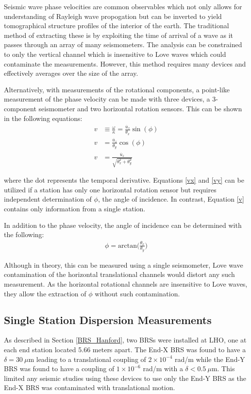 \documentclass [12pt, proquest]{uwthesis}[2019]
\begin{document}
Seismic wave phase velocities are common observables which not only allows for understanding of Rayleigh wave propogation but can be inverted to yield tomographical structure profiles of the interior of the earth. \cite{tomography} The traditional method of extracting these is by exploiting the time of arrival of a wave as it passes through an array of many seismometers. The analysis can be constrained to only the vertical channel which is insensitive to Love waves which could contaminate the measurements. However, this method requires many devices and effectively averages over the size of the array.

Alternatively, with measurements of the rotational components, a point-like measurement of the phase velocity can be made with three devices, a 3-component seismometer and two horizontal rotation sensors. This can be shown in the following equations:
\begin{align} 
v&\equiv\frac{\omega}{\kappa} = \frac{\dot{u_z}}{\theta_x}\sin(\phi) \label{vx} \\
v&=\frac{\dot{u_z}}{\theta_y}\cos(\phi)\label{vy} \\
v&=\frac{\dot{u_z}}{\sqrt{\theta_x^2+\theta_y^2}} \label{v}
\end{align}

where the dot represents the temporal derivative. Equations \ref{vx} and \ref{vy} can be utilized if a station has only one horizontal rotation sensor but requires independent determination of $\phi$, the angle of incidence. In contrast, Equation \ref{v} contains only information from a single station.

In addition to the phase velocity, the angle of incidence can be determined with the following:
\begin{align}
\phi=\text{arctan}\bigg(\frac{\theta_x}{\theta_y}\bigg)
\end{align}

Although in theory, this can be measured using a single seismometer, Love wave contamination of the horizontal translational channels would distort any such measurement. As the horizontal rotational channels are insensitive to Love waves, they allow the extraction of $\phi$ without such contamination.  

\subsection{Single Station Dispersion Measurements}
As described in Section \ref{BRS_Hanford}, two BRSs were installed at LHO, one at each end station located 5.66 meters apart. The End-X BRS was found to have a $\delta=30\ \mu \text{m}$ leading to a translational coupling of $2 \times 10^{-4}$ rad/m while the End-Y BRS was found to have a coupling of $1 \times 10^{-6}$ rad/m with a $\delta<0.5\ \mu \text{m}$. This limited any seismic studies using these devices to use only the End-Y BRS as the End-X BRS was contaminated with translational motion. 
\end{document}
